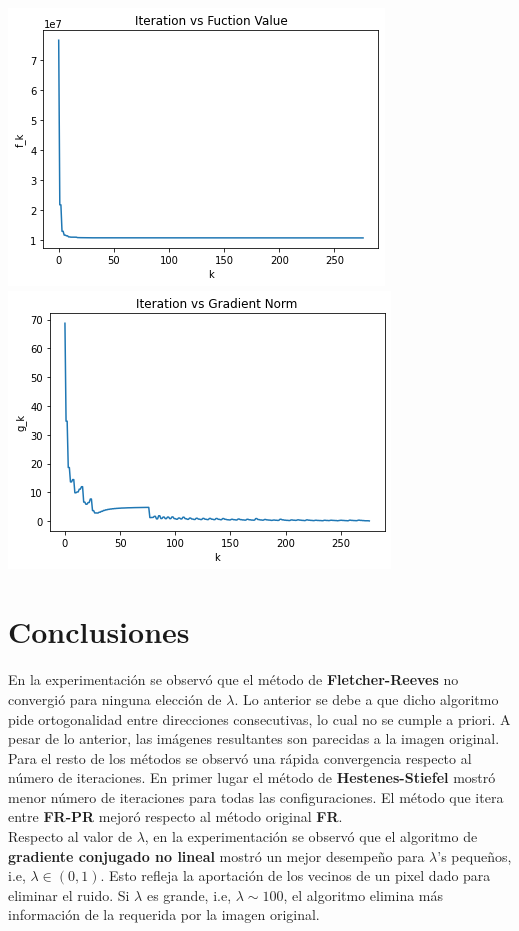 \documentclass[11pt,letterpaper]{article}
\theoremstyle{definition}
\theoremstyle{definition}
\theoremstyle{definition}
\begin{document}
\begin{center}
	\includegraphics[width=0.6\linewidth]{graficas/frpr/funcion_2}
	\includegraphics[width=0.6\linewidth]{graficas/frpr/gradiente_2}
\end{center}


\section{Conclusiones}
	En la experimentación se observó que el método de \textbf{Fletcher-Reeves} no convergió para ninguna elección de $ \lambda $. Lo anterior se debe a que dicho algoritmo pide ortogonalidad entre direcciones consecutivas, lo cual no se cumple a priori. A pesar de lo anterior, las imágenes resultantes son parecidas a la imagen original.
	\\
	Para el resto de los métodos se observó una rápida convergencia respecto al número de iteraciones. En primer lugar el método de \textbf{Hestenes-Stiefel} mostró menor número de iteraciones para todas las configuraciones. El método que itera entre \textbf{FR-PR} mejoró respecto al método original \textbf{FR}.
	\\
	Respecto al valor de $ \lambda $, en la experimentación se observó que el algoritmo de \textbf{gradiente conjugado no lineal} mostró un  mejor desempeño para $ \lambda $'s pequeños, i.e, $ \lambda \in (0,1) $. Esto refleja la aportación de los vecinos de un pixel dado para eliminar el ruido. Si $ \lambda $ es grande, i.e, $ \lambda \sim 100 $, el algoritmo elimina más información de la requerida por la imagen original.
\end{document}
